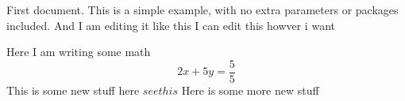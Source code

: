 \documentclass{article}
\begin{document}
First document. This is a simple example, with no 
extra parameters or packages included.
And I am editing it like this 
I can edit this
howver i want


Here I am writing some math $$2x + 5y = \frac{5}{5}$$
This is some new stuff
here \(see this\)
Here is some more new stuff
\end{document}
